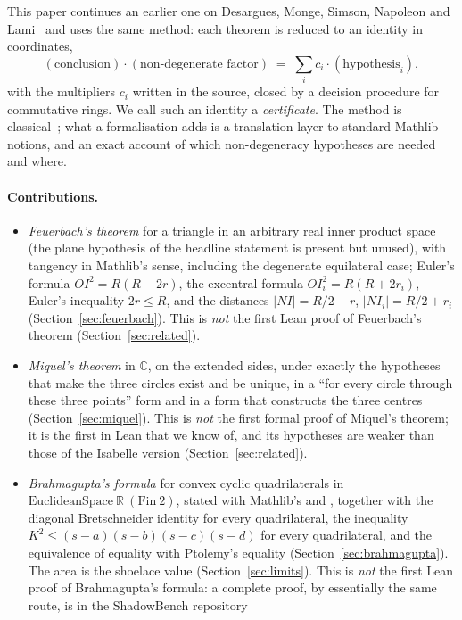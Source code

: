 \documentclass[11pt]{article}
\theoremstyle{definition}
\theoremstyle{remark}
\newcommand{\RR}{\mathbb{R}}
\newcommand{\CC}{\mathbb{C}}
\begin{document}
This paper continues an earlier one on Desargues, Monge, Simson, Napoleon and Lami~\cite{PaperA}
and uses the same method: each theorem is reduced to an identity in coordinates,
\[
  (\text{conclusion})\cdot(\text{non-degenerate factor}) \;=\; \sum_i c_i\cdot(\text{hypothesis}_i),
\]
with the multipliers $c_i$ written in the source, closed by a decision procedure for commutative
rings. We call such an identity a \emph{certificate}. The method is classical~\cite{Chou}; what a
formalisation adds is a translation layer to standard Mathlib notions, and an exact account of
which non-degeneracy hypotheses are needed and where.

\paragraph{Contributions.}
\begin{itemize}
\item \emph{Feuerbach's theorem} for a triangle in an arbitrary real inner product space (the
plane hypothesis of the headline statement is present but unused), with tangency in Mathlib's
sense, including the degenerate equilateral case; Euler's formula $OI^2=R(R-2r)$, the excentral
formula $OI_i^2=R(R+2r_i)$, Euler's inequality $2r\le R$, and the distances
$|NI|=R/2-r$, $|NI_i|=R/2+r_i$ (Section~\ref{sec:feuerbach}). This is \emph{not} the first Lean
proof of Feuerbach's theorem (Section~\ref{sec:related}).
\item \emph{Miquel's theorem} in $\CC$, on the extended sides, under exactly the hypotheses that
make the three circles exist and be unique, in a ``for every circle through these three points''
form and in a form that constructs the three centres (Section~\ref{sec:miquel}). This is
\emph{not} the first formal proof of Miquel's theorem; it is the first in Lean that we know of, and
its hypotheses are weaker than those of the Isabelle version (Section~\ref{sec:related}).
\item \emph{Brahmagupta's formula} for convex cyclic quadrilaterals in
$\mathrm{EuclideanSpace}\ \RR\ (\mathrm{Fin}\ 2)$, stated with Mathlib's 
and , together with the diagonal Bretschneider identity for every quadrilateral, the
inequality $K^2\le(s-a)(s-b)(s-c)(s-d)$ for every quadrilateral, and the equivalence of equality
with Ptolemy's equality (Section~\ref{sec:brahmagupta}). The area is the shoelace value
(Section~\ref{sec:limits}). This is \emph{not} the first Lean proof of Brahmagupta's formula: a
complete proof, by essentially the same route, is in the ShadowBench repository

\end{itemize}
\end{document}
